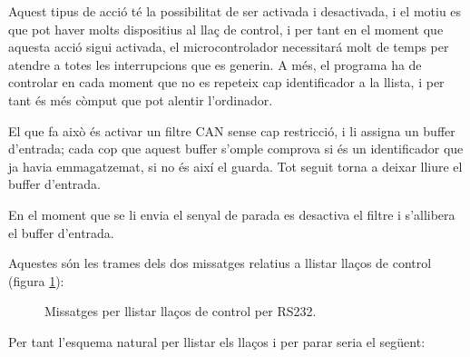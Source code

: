 Aquest tipus de acció té la possibilitat de ser activada i desactivada, i el motiu es que pot haver molts dispositius al llaç de control, i per tant en el moment que aquesta acció sigui activada, el microcontrolador necessitará molt de temps per atendre a totes les interrupcions que es generin. A més, el programa \DCSMonitor ha de controlar en cada moment que no es repeteix cap identificador a la llista, i per tant és més còmput que pot alentir l'ordinador.

El que fa això és activar un filtre CAN sense cap restricció, i li assigna un buffer d'entrada; cada cop que aquest buffer s'omple comprova si és un identificador que ja havia emmagatzemat, si no és així el guarda. Tot seguit torna a deixar lliure el buffer d'entrada.

En el moment que se li envia el senyal de parada es desactiva el filtre i s'allibera el buffer d'entrada.

Aquestes són les trames dels dos missatges relatius a llistar llaços de control (figura \ref{fig:bit_encoding:devices}):

\begin{figure}[ht!]
	
    \caption{Missatges per llistar llaços de control per RS232.}
    \label{fig:bit_encoding:devices}
\end{figure}

Per tant l'esquema natural per llistar els llaços i per parar seria el següent:

